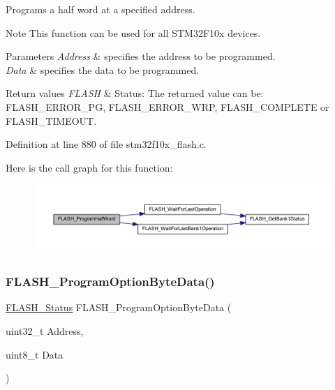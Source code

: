 Programs a half word at a specified address. 

\begin{DoxyNote}{Note}
This function can be used for all S\+T\+M32\+F10x devices. 
\end{DoxyNote}

\begin{DoxyParams}{Parameters}
{\em Address} & specifies the address to be programmed. \\
\hline
{\em Data} & specifies the data to be programmed. \\
\hline
\end{DoxyParams}

\begin{DoxyRetVals}{Return values}
{\em F\+L\+A\+SH} & Status\+: The returned value can be\+: F\+L\+A\+S\+H\+\_\+\+E\+R\+R\+O\+R\+\_\+\+PG, F\+L\+A\+S\+H\+\_\+\+E\+R\+R\+O\+R\+\_\+\+W\+RP, F\+L\+A\+S\+H\+\_\+\+C\+O\+M\+P\+L\+E\+TE or F\+L\+A\+S\+H\+\_\+\+T\+I\+M\+E\+O\+UT. \\
\hline
\end{DoxyRetVals}


Definition at line 880 of file stm32f10x\+\_\+flash.\+c.

Here is the call graph for this function\+:
\nopagebreak
\begin{figure}[H]
\begin{center}
\leavevmode
\includegraphics[width=350pt]{group___f_l_a_s_h___private___functions_ga5c1336f667950a8765887228f1d0d501_cgraph}
\end{center}
\end{figure}
\mbox{\label{group___f_l_a_s_h___private___functions_ga1382ff9d4ded8a5c076fde4fff529d21}} 
\subsubsection{\texorpdfstring{F\+L\+A\+S\+H\+\_\+\+Program\+Option\+Byte\+Data()}{FLASH\_ProgramOptionByteData()}}
{\footnotesize\ttfamily \hyperlink{group___f_l_a_s_h___exported___types_gadc63a6f3404ff1f71229a66915e9cdc0}{F\+L\+A\+S\+H\+\_\+\+Status} F\+L\+A\+S\+H\+\_\+\+Program\+Option\+Byte\+Data (\begin{DoxyParamCaption}\item[{uint32\+\_\+t}]{Address,  }\item[{uint8\+\_\+t}]{Data }\end{DoxyParamCaption})}



